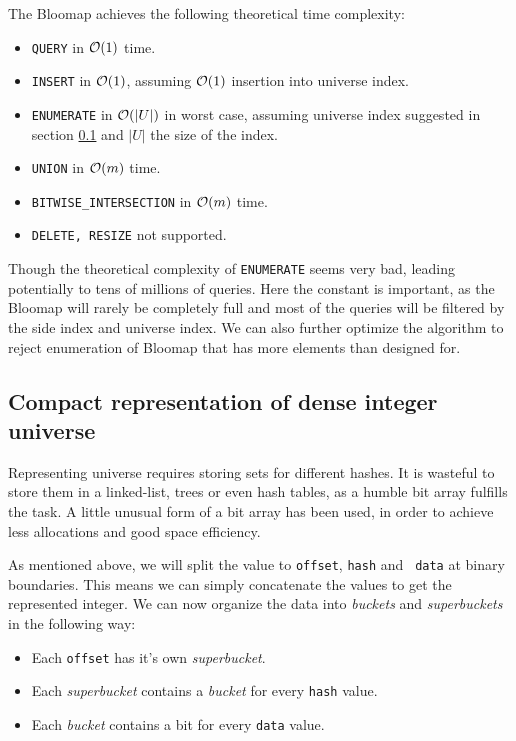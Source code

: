 The Bloomap achieves the following theoretical time complexity:

\begin{itemize}
	\item {\tt QUERY} in $\mathcal{O}(1)$ time.
	\item {\tt INSERT} in $\mathcal{O}(1)$, assuming $\mathcal{O}(1)$ insertion into universe
		index.
	\item {\tt ENUMERATE} in $\mathcal{O}(|U|)$ in worst case, assuming universe index
		suggested in section \ref{sec-compact-representation} and $|U|$ the size
		of the index.
	\item {\tt UNION} in $\mathcal{O}(m)$ time.
	\item {\tt BITWISE\_INTERSECTION} in $\mathcal{O}(m)$ time.
	\item {\tt DELETE{\rm ,} RESIZE} not supported.
\end{itemize}

Though the theoretical complexity of {\tt ENUMERATE} seems very bad, leading
potentially to tens of millions of queries. Here the constant is important, as
the Bloomap will rarely be completely full and most of the queries will be
filtered by the side index and universe index. We can also further optimize the
algorithm to reject enumeration of Bloomap that has more elements than designed
for.

\subsection{Compact representation of dense integer universe}
\label{sec-compact-representation}

Representing universe requires storing sets for different hashes. It is wasteful
to store them in a linked-list, trees or even hash tables, as a humble bit array
fulfills the task. A little unusual form of a bit array has been used, in order
to achieve less allocations and good space efficiency.

As mentioned above, we will split the value to {\tt offset}, {\tt hash} and {\tt
data} at binary boundaries. This means we can simply concatenate the values to
get the represented integer. We can now organize the data into {\it buckets} and
{\it superbuckets} in the following way:

\begin{itemize}
	\item Each {\tt offset} has it's own {\it superbucket}.
	\item Each {\it superbucket} contains a {\it bucket} for every {\tt hash} value.
	\item Each {\it bucket} contains a bit for every {\tt data} value.
\end{itemize}

